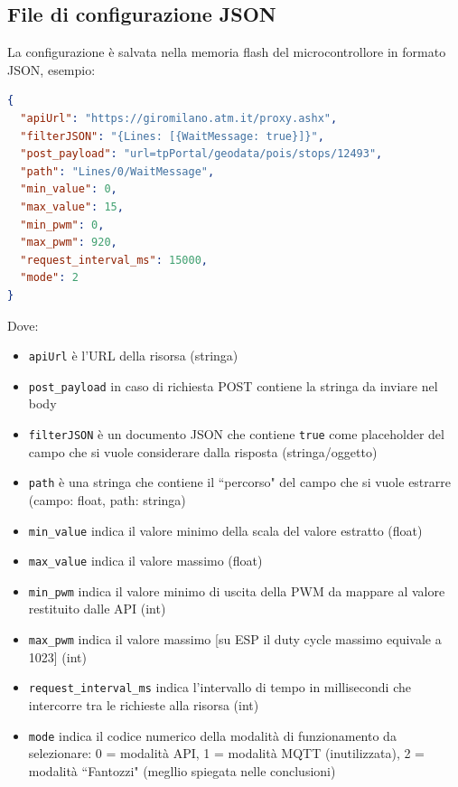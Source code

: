\documentclass[12pt,a4paper]{report}
\begin{document}
\pagebreak %
\subsection{File di configurazione JSON}
La configurazione è salvata nella memoria flash del microcontrollore
in formato JSON, esempio:

\begin{lstlisting}[language=json,firstnumber=1]
{
  "apiUrl": "https://giromilano.atm.it/proxy.ashx",
  "filterJSON": "{Lines: [{WaitMessage: true}]}",
  "post_payload": "url=tpPortal/geodata/pois/stops/12493",
  "path": "Lines/0/WaitMessage",
  "min_value": 0,
  "max_value": 15,
  "min_pwm": 0,
  "max_pwm": 920,
  "request_interval_ms": 15000,
  "mode": 2
}
\end{lstlisting}


\noindent Dove:
\begin{itemize}
  \item \texttt{apiUrl} è l'URL della risorsa (stringa)
  \item \texttt{post_payload} in caso di richiesta POST contiene la stringa da inviare nel body
  \item \texttt{filterJSON} è un documento JSON che contiene \texttt{true} come placeholder del campo che si vuole considerare dalla risposta (stringa/oggetto)
  \item \texttt{path} è una stringa che contiene il ``percorso" del campo che si vuole estrarre (campo: float, path: stringa)
  \item \texttt{min_value} indica il valore minimo della scala del valore estratto (float)
  \item \texttt{max_value} indica il valore massimo (float)
  \item \texttt{min_pwm} indica il valore minimo di uscita della PWM da mappare al valore restituito dalle API (int)
  \item \texttt{max_pwm} indica il valore massimo [su ESP il duty cycle massimo equivale a 1023] (int)
  \item \texttt{request_interval_ms} indica l'intervallo di tempo in millisecondi che intercorre tra le richieste alla risorsa (int)
  \item \texttt{mode} indica il codice numerico della modalità di funzionamento da selezionare: 0 = modalità API, 1 = modalità MQTT (inutilizzata), 2 = modalità ``Fantozzi" (megllio spiegata nelle conclusioni)
\end{itemize}
\end{document}
